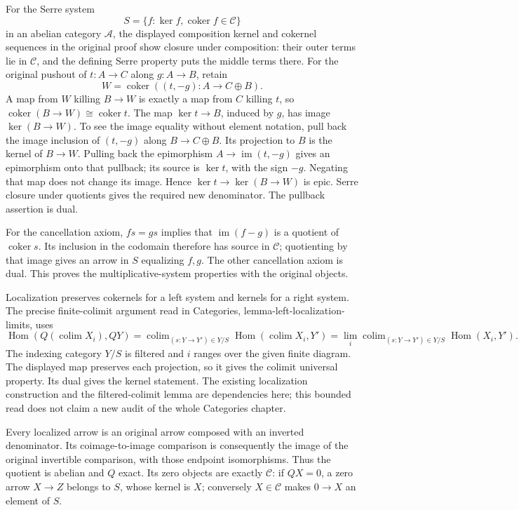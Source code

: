 For the Serre system \[
S=\{f:\ker f,\operatorname{coker}f\in\mathcal C\}
\] in an abelian category \(\mathcal A\), the displayed composition kernel and cokernel sequences in the original proof show closure under composition: their outer terms lie in \(\mathcal C\), and the defining Serre property puts the middle terms there. For the original pushout of \(t:A\to C\) along \(g:A\to B\), retain \[
W=\operatorname{coker}((t,-g):A\to C\oplus B).
\] A map from \(W\) killing \(B\to W\) is exactly a map from \(C\) killing \(t\), so \(\operatorname{coker}(B\to W)\cong\operatorname{coker}t\). The map \(\ker t\to B\), induced by \(g\), has image \(\ker(B\to W)\). To see the image equality without element notation, pull back the image inclusion of \((t,-g)\) along \(B\to C\oplus B\). Its projection to \(B\) is the kernel of \(B\to W\). Pulling back the epimorphism \(A\to\operatorname{im}(t,-g)\) gives an epimorphism onto that pullback; its source is \(\ker t\), with the sign \(-g\). Negating that map does not change its image. Hence \(\ker t\to\ker(B\to W)\) is epic. Serre closure under quotients gives the required new denominator. The pullback assertion is dual.

For the cancellation axiom, \(fs=gs\) implies that \(\operatorname{im}(f-g)\) is a quotient of \(\operatorname{coker}s\). Its inclusion in the codomain therefore has source in \(\mathcal C\); quotienting by that image gives an arrow in \(S\) equalizing \(f,g\). The other cancellation axiom is dual. This proves the multiplicative-system properties with the original objects.

Localization preserves cokernels for a left system and kernels for a right system. The precise finite-colimit argument read in Categories, lemma-left-localization-limits, uses \[
\operatorname{Hom}(Q(\operatorname{colim}X_i),QY)
 =
\operatorname{colim}_{(s:Y\to Y')\in Y/S}
\operatorname{Hom}(\operatorname{colim}X_i,Y')
 =
\lim_i\operatorname{colim}_{(s:Y\to Y')\in Y/S}
\operatorname{Hom}(X_i,Y').
\] The indexing category \(Y/S\) is filtered and \(i\) ranges over the given finite diagram. The displayed map preserves each projection, so it gives the colimit universal property. Its dual gives the kernel statement. The existing localization construction and the filtered-colimit lemma are dependencies here; this bounded read does not claim a new audit of the whole Categories chapter.

Every localized arrow is an original arrow composed with an inverted denominator. Its coimage-to-image comparison is consequently the image of the original invertible comparison, with those endpoint isomorphisms. Thus the quotient is abelian and \(Q\) exact. Its zero objects are exactly \(\mathcal C\): if \(QX=0\), a zero arrow \(X\to Z\) belongs to \(S\), whose kernel is \(X\); conversely \(X\in\mathcal C\) makes \(0\to X\) an element of \(S\).

